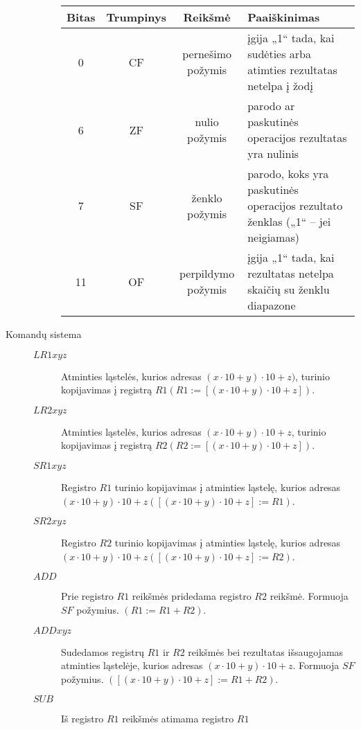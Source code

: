 \begin{description}
\begin{description}
        \begin{tabularx}{0.85\textwidth}{|c|c|c|X|} 
          \hline
          Bitas & Trumpinys & Reikšmė & Paaiškinimas \\
          \hline
          0 & CF & pernešimo požymis & įgija „1“ tada, kai sudėties arba
          atimties rezultatas netelpa į žodį \\
          \hline
          6 & ZF & nulio požymis & parodo ar paskutinės operacijos 
          rezultatas yra nulinis \\
          \hline
          7 & SF & ženklo požymis & parodo, koks yra paskutinės operacijos 
          rezultato ženklas („1“ – jei neigiamas) \\
          \hline
          11 & OF & perpildymo požymis & įgija „1“ tada, kai rezultatas
          netelpa skaičių su ženklu diapazone \\
          \hline
        \end{tabularx}
    \end{description}
  \item[Komandų sistema] \hfill
    \begin{description} 
        \item[$LR1 xyz$] Atminties ląstelės, kurios adresas 
          $(x \cdot 10 + y) \cdot 10 + z)$, turinio kopijavimas į 
          registrą $R1 (R1 := [(x \cdot 10 + y) \cdot 10 + z])$.
        \item[$LR2 xyz$] Atminties ląstelės, kurios adresas 
          $(x \cdot 10 + y) \cdot 10 + z$, turinio kopijavimas į 
          registrą $R2 (R2:=[(x \cdot 10+y) \cdot 10+z])$.
        \item[$SR1 xyz$] Registro $R1$ turinio kopijavimas į atminties 
          ląstelę, kurios adresas 
          $(x \cdot 10+y) \cdot 10+z ([(x \cdot 10+y) \cdot 10+z]:=R1)$.
        \item[$SR2 xyz$] Registro $R2$ turinio kopijavimas į atminties 
          ląstelę, kurios adresas 
          $(x \cdot 10+y) \cdot 10+z ([(x \cdot 10+y) \cdot 10+z]:=R2)$.
        \item[$ADD$] Prie registro $R1$ reikšmės pridedama registro $R2$ 
          reikšmė. Formuoja $SF$ požymius. $(R1:=R1+R2)$.
        \item[$ADD xyz$] Sudedamos registrų $R1$ ir $R2$ reikšmės bei 
          rezultatas išsaugojamas atminties ląstelėje, kurios adresas 
          $(x \cdot 10+y) \cdot 10+z$. Formuoja $SF$ požymius. 
          $([(x \cdot 10+y) \cdot 10+z]:=R1+R2)$.
        \item[$SUB$] Iš registro $R1$ reikšmės atimama registro $R1$ 

\end{description}
\end{description}
